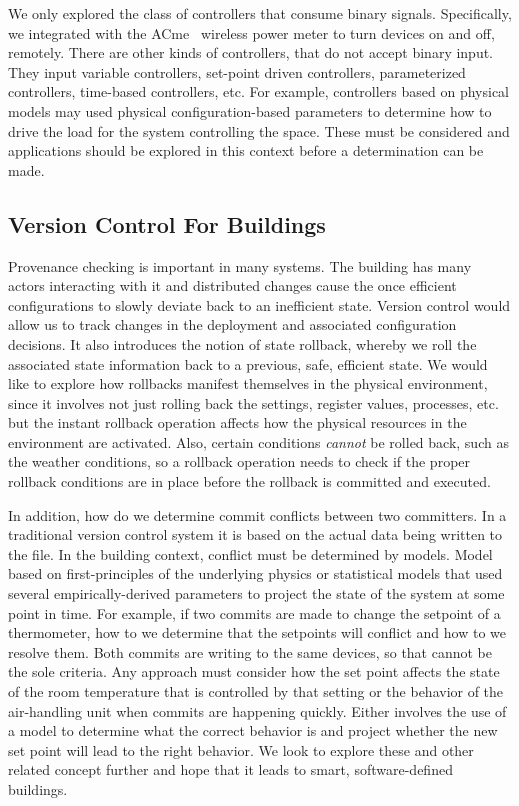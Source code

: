 We only explored the class of controllers that consume binary signals.  Specifically, we integrated with the ACme~\cite{acme}
wireless power meter to turn devices on and off, remotely.  There are other kinds of controllers, that do not accept binary input.
They input variable controllers, set-point driven controllers, parameterized controllers, time-based controllers, etc.  For example, 
controllers based on physical models may used physical configuration-based parameters to determine how to drive the 
load for the system controlling the space.  These must be considered and applications should be explored in this context
before a determination can be made.


\subsection{Version Control For Buildings}
Provenance checking is important in many systems.  The building has many actors interacting with it and distributed changes cause
the once efficient configurations to slowly deviate back to an inefficient state.  Version control would allow us to track changes
in the deployment and associated configuration decisions.  It also introduces the notion of state rollback, whereby we roll the associated state
information back to a previous, safe, efficient state.  We would like to explore how rollbacks manifest themselves in the 
physical environment, since it involves not just rolling back the settings, register values, processes, etc. but the instant 
rollback operation affects how the physical resources in the environment are activated.  Also, certain conditions \emph{cannot}
be rolled back, such as the weather conditions, so a rollback operation needs to check if the proper rollback conditions
are in place before the rollback is committed and executed.

In addition, how do we determine commit conflicts between two committers.  In a traditional version control system it is based on the actual
data being written to the file.  In the building context, conflict must be determined by models.  Model based on first-principles
of the underlying physics or statistical models that used several empirically-derived parameters to project the state of 
the system at some point in time.  For example, if two commits are made to change the setpoint of a thermometer, how to we determine
that the setpoints will conflict and how to we resolve them.  Both commits are writing to the same devices, so that cannot be the sole
criteria.  Any approach must consider how the set point affects the state of the room temperature that is controlled by that setting
or the behavior of the air-handling unit when commits are happening quickly.  Either involves the use of a model to determine
what the correct behavior is and project whether the new set point will lead to the right behavior.
We look to explore these and other related concept further and hope that it leads to smart, software-defined buildings.


